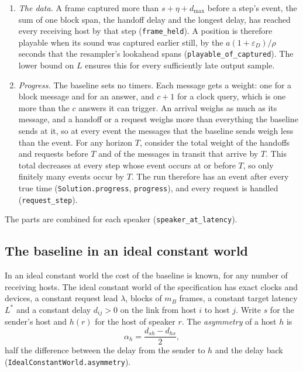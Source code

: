 \documentclass[11pt,a4paper]{article}
\newcommand{\lean}[1]{\texttt{#1}}
\theoremstyle{definition}
\begin{document}
\begin{enumerate}
  (\lean{advance\_tracks}), and a position at any distance gets closer by
  at least $w - \nu$ frames per output sample until it is within $B$
  (\lean{advance\_converges}). The positions that the baseline chooses
  follow this recursion within a block (\lean{positions\_block},
  \lean{chosen\_succ}) and from one request to the next
  (\lean{last\_at\_next\_request}).
\item \emph{The data.} A frame captured more than $s + \eta + d_{\max}$
  before a step's event, the sum of one block span, the handoff delay and
  the longest delay, has reached every receiving host by that step
  (\lean{frame\_held}). A position is therefore playable when its sound was
  captured earlier still, by the $a(1 + \varepsilon_D)/\rho$ seconds that
  the resampler's lookahead spans (\lean{playable\_of\_captured}). The lower
  bound on $L$ ensures this for every sufficiently late output sample.
\item \emph{Progress.} The baseline sets no timers. Each message gets a
  weight: one for a block message and for an answer, and $c + 1$ for a
  clock query, which is one more than the $c$ answers it can trigger. An
  arrival weighs as much as its message, and a handoff or a request weighs
  more than everything the baseline sends at it, so at every event the
  messages that the baseline sends weigh less than the event. For any
  horizon $T$, consider the total weight of the handoffs and requests
  before $T$ and of the messages in transit that arrive by $T$. This total
  decreases at every step whose event occurs at or before $T$, so only
  finitely many events occur by $T$. The run therefore has an event after
  every true time (\lean{Solution.progress}, \lean{progress}), and every
  request is handled (\lean{request\_step}).
\end{enumerate}
The parts are combined for each speaker (\lean{speaker\_at\_latency}).

\subsection{The baseline in an ideal constant world}

In an ideal constant world the cost of the baseline is known, for any
number of receiving hosts. The ideal constant world of the specification
has exact clocks and devices, a constant request lead $\lambda$, blocks of
$m_B$ frames, a constant target latency $L^*$ and a constant delay
$d_{ij} > 0$ on the link from host $i$ to host $j$. Write $s$ for the
sender's host and $h(r)$ for the host of speaker $r$. The \emph{asymmetry}
of a host $h$ is
\[
  \alpha_h = \frac{d_{sh} - d_{hs}}{2},
\]
half the difference between the delay from the sender to $h$ and the delay
back (\lean{IdealConstantWorld.\allowbreak asymmetry}).
\end{document}
